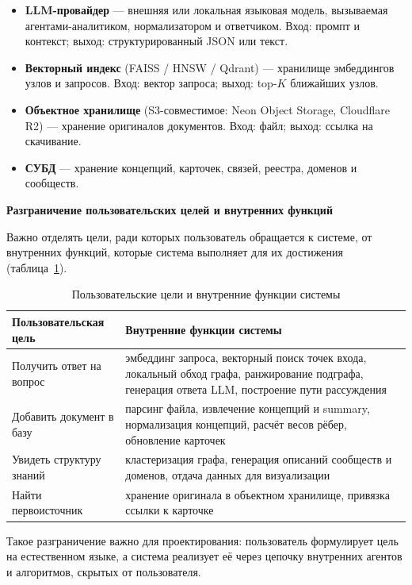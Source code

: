 \begin{itemize}
    \item \textbf{LLM-провайдер} --- внешняя или локальная языковая модель, вызываемая агентами-аналитиком, нормализатором и ответчиком. Вход: промпт и контекст; выход: структурированный JSON или текст.
    \item \textbf{Векторный индекс} (FAISS / HNSW / Qdrant) --- хранилище эмбеддингов узлов и запросов. Вход: вектор запроса; выход: top-$K$ ближайших узлов.
    \item \textbf{Объектное хранилище} (S3-совместимое: Neon Object Storage, Cloudflare R2) --- хранение оригиналов документов. Вход: файл; выход: ссылка на скачивание.
    \item \textbf{СУБД} --- хранение концепций, карточек, связей, реестра, доменов и сообществ.
\end{itemize}

\textbf{Разграничение пользовательских целей и внутренних функций}

Важно отделять цели, ради которых пользователь обращается к системе, от внутренних функций, которые система выполняет для их достижения (таблица~\ref{table:goals_functions}).

\begin{table}[H]
\centering
\caption{Пользовательские цели и внутренние функции системы}
\label{table:goals_functions}
\begin{tabularx}{\textwidth}{|>{\RaggedRight\arraybackslash}X|>{\RaggedRight\arraybackslash}X|}
\hline
\textbf{Пользовательская цель} & \textbf{Внутренние функции системы} \\ \hline
Получить ответ на вопрос & эмбеддинг запроса, векторный поиск точек входа, локальный обход графа, ранжирование подграфа, генерация ответа LLM, построение пути рассуждения \\ \hline
Добавить документ в базу & парсинг файла, извлечение концепций и summary, нормализация концепций, расчёт весов рёбер, обновление карточек \\ \hline
Увидеть структуру знаний & кластеризация графа, генерация описаний сообществ и доменов, отдача данных для визуализации \\ \hline
Найти первоисточник & хранение оригинала в объектном хранилище, привязка ссылки к карточке \\ \hline
\end{tabularx}
\end{table}

Такое разграничение важно для проектирования: пользователь формулирует цель на естественном языке, а система реализует её через цепочку внутренних агентов и алгоритмов, скрытых от пользователя.




